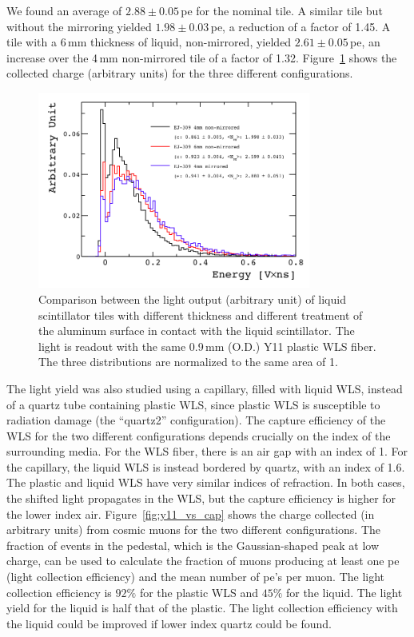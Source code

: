 \documentclass[review]{elsarticle}
\begin{document}
We found an average of 
$2.88\pm 0.05$\,pe for the nominal tile. A similar tile but without
the mirroring yielded $1.98\pm 0.03$\,pe, a reduction of a factor of
1.45. A tile with a 6\,mm thickness of liquid, non-mirrored, yielded
$2.61\pm 0.05$\,pe, an increase over the 4\,mm non-mirrored tile of a
factor of 1.32.
Figure~\ref{fig:thickness_comp} shows the collected charge (arbitrary units)
for the three different configurations.

\begin{figure}[!ht]
\begin{center}
\includegraphics[width=0.8\textwidth]{./figures/list_NEW_PROTOTYPES_all.png}
\caption{Comparison between the light output (arbitrary unit)
  of liquid scintillator
  tiles with different thickness and different treatment of the
  aluminum surface in contact with the liquid scintillator. The light
  is readout with the same 0.9\,mm (O.D.) Y11 plastic WLS fiber. The
  three distributions are normalized to the same area of 1.}
\label{fig:thickness_comp}
\end{center}
\end{figure}


The light yield was also studied using a capillary, filled
with liquid WLS, instead of a quartz tube containing plastic WLS, since
plastic WLS is susceptible to radiation damage (the ``quartz2'' configuration).
The capture efficiency of the WLS for the two different configurations
depends crucially on the index of the surrounding media.  For the WLS fiber,
there is an air gap with an index of 1.  For the capillary, the liquid WLS
is instead bordered by quartz, with an index of 1.6.
The plastic and liquid WLS have very similar
indices of refraction.  In both cases, the shifted light propagates
in the WLS, but the capture efficiency is higher for the lower index air.
Figure~\ref{fig:y11_vs_cap} shows the charge collected (in arbitrary units)
from cosmic muons for the two different configurations.  The fraction of
events in the pedestal, which is the Gaussian-shaped peak at low charge,
can be used to calculate the fraction of muons producing at least one pe
(light collection efficiency)
and the mean number of pe's per muon.
The light collection efficiency
is  $92\%$ for the plastic WLS and  $45\%$ for the liquid.  The light
yield for the liquid is half that of the plastic.
The light collection efficiency with the liquid could be improved
if lower index quartz
could be found.
\end{document}
